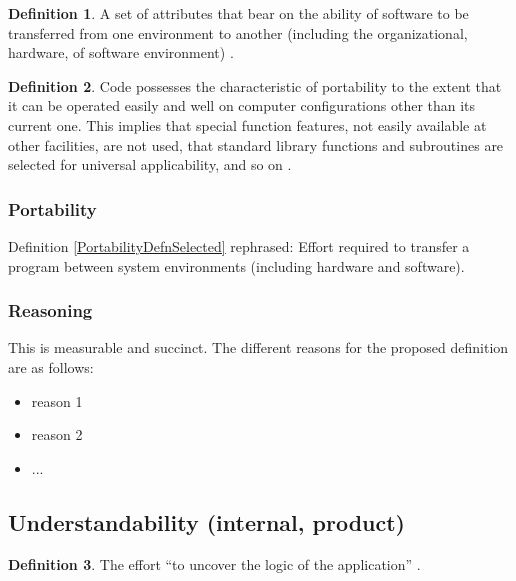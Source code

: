 \documentclass[letterpaper, cleveref]{lipics-v2019}
\newcommand{\authornote}[3]{\textcolor{#1}{[#3 ---#2]}}
\newcommand{\authornote}[3]{}
\newcommand{\jc}[1]{\authornote{red}{JC}{#1}} %
\newcommand{\notdone}[1]{\textcolor{red}{#1}}
\theoremstyle{definition}
\newtheorem{defn}{Definition}
\begin{document}
\begin{defn}
  A set of attributes that bear on the ability of software to be transferred
  from one environment to another (including the organizational, hardware, of
  software environment) \citep{pfleeger2006software}.
\end{defn}

\begin{defn}
  Code possesses the characteristic of portability to the extent that it can
  be operated easily and well on computer configurations other than its
  current one. This implies that special function features, not easily
  available at other facilities, are not used, that standard library
  functions and subroutines are selected for universal applicability, and so
  on \citep{boehm2007software}.
\end{defn}

\begin{mybox}
\subsubsection*{Portability}
Definition \ref{PortabilityDefnSelected} rephrased: Effort required to transfer
a program between system environments (including hardware and software).
\end{mybox}

\subsubsection*{Reasoning}

This is measurable and succinct.   The different reasons for the proposed
definition are as follows:

\begin{itemize}
  \item reason 1
  \item reason 2
  \item ...
\end{itemize}


\subsection{Understandability (internal, product)} %

\begin{defn}
  The effort ``to uncover the logic of the application''
  \citep{ghezzi1991fundamentals}.
\end{defn}
\end{document}
